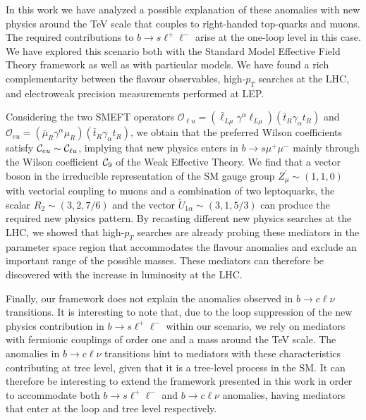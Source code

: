 \documentclass[aps,twocolumn,showpacs,preprintnumbers,amsmath,amssymb,floatfix,nofootinbib]{revtex4-1}
\newcommand{\C}{{\cal C}}
\begin{document}
In this work we have analyzed a possible explanation of these anomalies with new physics around the TeV scale that couples to right-handed top-quarks and muons.      The required contributions to $b \to s \ell^+ \ell^-$ arise at the one-loop level in this case.   We have explored this scenario both with the Standard Model Effective Field Theory framework as well as with particular models.     We have found a rich complementarity between the flavour observables, high-$p_T$ searches at the LHC, and electroweak precision measurements performed at LEP.  

Considering the two SMEFT operators $\mathcal{O}_{\ell u}= (\bar \ell_{ L \mu} \gamma^{\alpha}  \ell_{ L \mu}) (\bar t_R \gamma_{\alpha}  t_R  )$ and  $\mathcal{O}_{e u}=  (\bar \mu_{R} \gamma^{\alpha}  \mu_{R})  (\bar t_R \gamma_{\alpha}  t_R  )$, we obtain that the preferred Wilson coefficients satisfy $\C_{eu} \sim \C_{\ell u}$, implying that new physics enters in $b \to s \mu^+ \mu^-$ mainly through the Wilson coefficient $\C_9$ of the Weak Effective Theory.  We find that a vector boson in the irreducible representation of the SM gauge group $Z_{\mu}^{\prime} \sim (1,1,0)$ with vectorial coupling to muons and a combination of two leptoquarks, the scalar $R_2 \sim (3,2,7/6)$ and the vector $\widetilde U_{1 \alpha} \sim (3,1,5/3)$ can produce the required new physics pattern. By recasting different new physics searches at the LHC, we showed that high-$p_T$ searches are already probing these mediators in the parameter space region that accommodates the flavour anomalies and exclude an important range of the possible masses. These mediators can therefore be discovered with the increase in luminosity at the LHC.  

Finally, our framework does not explain the anomalies observed in $b \to c \ell \nu$ transitions.    It is interesting to note that, due to the loop suppression of the new physics contribution in $b \to s \ell^+ \ell^-$ within our scenario, we rely on mediators with fermionic couplings of order one and a mass around the TeV scale.    The anomalies in $b \to c \ell \nu$ transitions hint to mediators with these characteristics contributing at tree level, given that it is a tree-level process in the SM.    It can therefore be interesting to extend the framework presented in this work in order to accommodate both $b \to s \ell^+ \ell^-$ and $b \to c \ell \nu$ anomalies, having mediators that enter at the loop and tree level respectively.    
\end{document}
